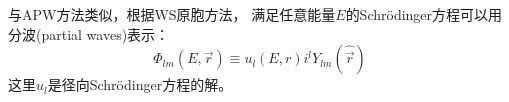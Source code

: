 与APW方法类似，根据WS原胞方法\cite{PR43-804_1933}，%
满足任意能量$E$的Schr\"odinger方程可以用分波(partial waves)表示：
\begin{equation}
  \Phi_{lm}(E,\vec r)\equiv u_l(E,r)i^lY_{lm}(\hat{\vec r})
  \label{eq:solid-130}
\end{equation}
这里$u_l$是径向Schr\"odinger方程的解。


